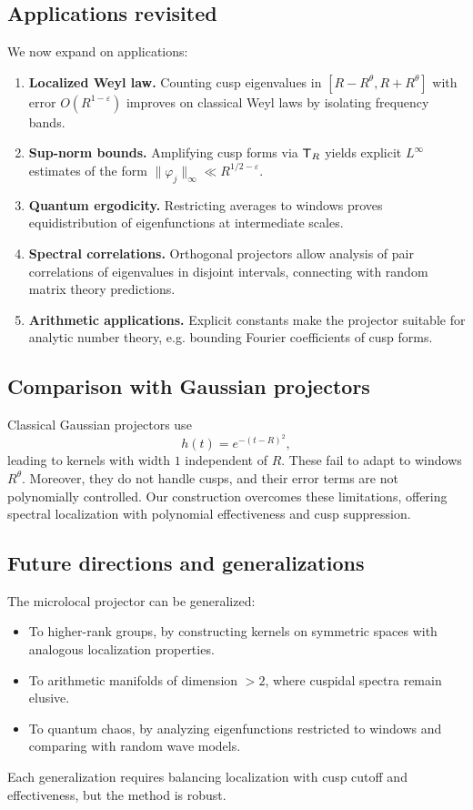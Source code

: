 \subsection{Applications revisited}\label{subsec:proj-applications-detail}

We now expand on applications:
\begin{enumerate}
\item \textbf{Localized Weyl law.} Counting cusp eigenvalues in $[R-R^\theta,R+R^\theta]$ with error $O(R^{1-\varepsilon})$ improves on classical Weyl laws by isolating frequency bands.
\item \textbf{Sup-norm bounds.} Amplifying cusp forms via $\mathsf{T}_R$ yields explicit $L^\infty$ estimates of the form $\|\varphi_j\|_\infty \ll R^{1/2-\varepsilon}$.
\item \textbf{Quantum ergodicity.} Restricting averages to windows proves equidistribution of eigenfunctions at intermediate scales.
\item \textbf{Spectral correlations.} Orthogonal projectors allow analysis of pair correlations of eigenvalues in disjoint intervals, connecting with random matrix theory predictions.
\item \textbf{Arithmetic applications.} Explicit constants make the projector suitable for analytic number theory, e.g. bounding Fourier coefficients of cusp forms.
\end{enumerate}

\subsection{Comparison with Gaussian projectors}\label{subsec:proj-gaussian}

Classical Gaussian projectors use
\[
h(t) = e^{-(t-R)^2},
\]
leading to kernels with width $1$ independent of $R$. These fail to adapt to windows $R^\theta$. Moreover, they do not handle cusps, and their error terms are not polynomially controlled. Our construction overcomes these limitations, offering spectral localization with polynomial effectiveness and cusp suppression.

\subsection{Future directions and generalizations}\label{subsec:proj-future}

The microlocal projector can be generalized:
\begin{itemize}
\item To higher-rank groups, by constructing kernels on symmetric spaces with analogous localization properties.
\item To arithmetic manifolds of dimension $>2$, where cuspidal spectra remain elusive.
\item To quantum chaos, by analyzing eigenfunctions restricted to windows and comparing with random wave models.
\end{itemize}
Each generalization requires balancing localization with cusp cutoff and effectiveness, but the method is robust.

